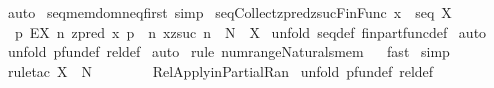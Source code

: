\begin{isabellebody}
\isamarkupfalse%
\ auto\isanewline
{}\isamarkupfalse%
%
\endisatagproof
{\isafoldproof}%
%
\isadelimproof
\isanewline
%
\endisadelimproof
\isanewline
\isanewline
\isanewline
{}\isamarkupfalse%
\ seq{\isacharunderscore}mem{\isacharunderscore}dom{\isacharunderscore}neq{\isacharunderscore}first\ {\isacharbrackleft}simp{\isacharbrackright}\isanewline
\isanewline
\isanewline
{}\isamarkupfalse%
\ seq{\isacharunderscore}Collect{\isacharunderscore}zpred{\isacharunderscore}zsuc{\isacharunderscore}Fin{\isacharunderscore}Func{\isacharcolon}\ {\isachardoublequoteopen}x\ {\isacharcolon}\ seq\ X\ {\isacharequal}{\isacharequal}{\isachargreater}\ \ \isanewline
\ \ {\isacharbraceleft}p{\isachardot}\ EX\ n{\isacharcolon}\ {}{\isachardot}{\isachardot}zpred\ {\isacharparenleft}{\isacharhash}x{\isacharparenright}{\isachardot}\ p\ {\isacharequal}\ {\isacharparenleft}n{\isacharcomma}\ x{\isacharpercent}{\isacharcircum}{\isacharparenleft}zsuc\ n{\isacharparenright}{\isacharparenright}{\isacharbraceright}\ {\isacharcolon}\ {\isacharparenleft}{\isacharpercent}N\ {\isacharminus}{\isacharbar}{\isacharbar}{\isacharminus}{\isachargreater}\ X{\isacharparenright}{\isachardoublequoteclose}\isanewline
%
\isadelimproof
%
\endisadelimproof
%
\isatagproof
{}\isamarkupfalse%
\ {\isacharparenleft}unfold\ seq{\isacharunderscore}def\ fin{\isacharunderscore}part{\isacharunderscore}func{\isacharunderscore}def{\isacharparenright}\isanewline
{}\isamarkupfalse%
\ auto\isanewline
{}\isamarkupfalse%
\ {\isacharparenleft}unfold\ pfun{\isacharunderscore}def\ rel{\isacharunderscore}def{\isacharparenright}\isanewline
{}\isamarkupfalse%
\ auto\isanewline
{}\isamarkupfalse%
\ {\isacharparenleft}rule\ num{\isacharunderscore}range{\isacharunderscore}Naturals{\isacharunderscore}mem{\isacharparenright}\isanewline
{}\isamarkupfalse%
\ {}\isanewline
{}\isamarkupfalse%
\ fast\isanewline
{}\isamarkupfalse%
\ simp\isanewline
{}\isamarkupfalse%
\ {\isacharparenleft}rule{\isacharunderscore}tac\ X\ {\isacharequal}\ {\isachardoublequoteopen}{\isacharpercent}N{\isachardoublequoteclose}\ \ \isanewline
\ \ \ \ \ \ Rel{\isacharunderscore}Apply{\isacharunderscore}in{\isacharunderscore}Partial{\isacharunderscore}Ran{\isacharparenright}\isanewline
{}\isamarkupfalse%
\ {\isacharparenleft}unfold\ pfun{\isacharunderscore}def\ rel{\isacharunderscore}def{\isacharparenright}\isanewline

\end{isabellebody}
